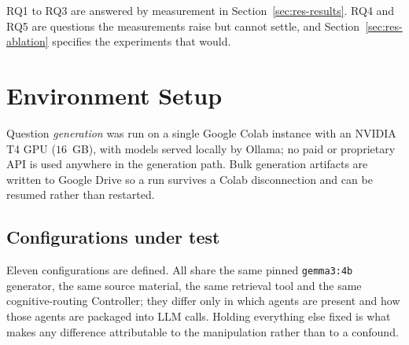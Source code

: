 RQ1 to RQ3 are answered by measurement in Section~\ref{sec:res-results}. RQ4 and
RQ5 are questions the measurements raise but cannot settle, and
Section~\ref{sec:res-ablation} specifies the experiments that would.

\section{Environment Setup}
\label{sec:res-env}

Question \emph{generation} was run on a single Google Colab instance with an
NVIDIA T4 GPU ($16$\, GB), with models served locally by Ollama; no paid or
proprietary API is used anywhere in the generation path. Bulk generation
artifacts are written to Google Drive so a run survives a Colab disconnection
and can be resumed rather than restarted.

\subsection{Configurations under test}
\label{sec:res-configs}

Eleven configurations are defined. All share the same pinned
\texttt{gemma3:4b} generator, the same source material, the same retrieval
tool and the same cognitive-routing Controller; they differ only in which
agents are present and how those agents are packaged into LLM calls. Holding
everything else fixed is what makes any difference attributable to the
manipulation rather than to a confound.

